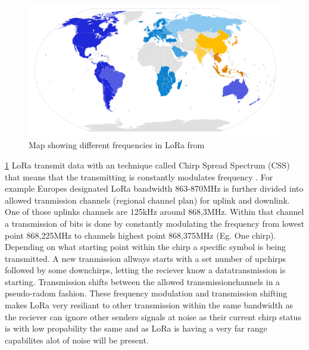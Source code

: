 \documentclass[article,a4paper]{IEEEtran}
\begin{document}
    \begin{figure}
        \includegraphics[width=\columnwidth]{LoRaWANdivide.png} 
        \caption{Map showing different frequencies in LoRa from \cite{LoRaWanfreqCountry}}
        \label{fig3:freq LoRaWAN}   
    \end{figure}
    \ref{fig3:freq LoRaWAN}
    LoRa transmit data with an technique called Chirp Spread Spectrum (CSS) that means that the transmitting is constantly modulates frequency \cite{LoraWanSpecOverview,LoRaTutorial}. For example Europes designated LoRa bandwidth 863-870MHz is further divided into allowed tranmission channels (regional channel plan) for uplink and downlink. One of those uplinks channels are 125kHz around 868,3MHz. Within that channel a transmission of bits is done by constantly modulating the frequency from lowest point 868,225MHz to channels highest point 868,375MHz (Eg. One chirp). Depending on what starting point within the chirp a specific symbol is being transmitted. A new tranmission allways starts with a set number of upchirps followed by some downchirps, letting the reciever know a datatransmission is starting. Transmission shifts between the allowed transmissionchannels in a pseudo-radom fashion. These frequency modulation and transmission shifting makes LoRa very resiliant to other transmission within the same bandwidth as the reciever can ignore other senders signals at noise as their current chirp status is with low propability the same and as LoRa is having a very far range capabilites alot of noise will be present.      
    \newline\newline
\end{document}
